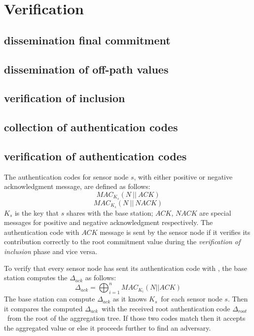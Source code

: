 \chapter{Verification}

\section{dissemination final commitment}
\section{dissemination of off-path values}
\section{verification of inclusion}
\section{collection of authentication codes}
\section{verification of authentication codes}
	The authentication codes for sensor node $s$, with either positive or negative acknowledgment message, are defined as follows:
	\begin{equation}
		MAC_{K_{s}}(N\ ||\ \textit{ACK})
	\end{equation}
	\begin{equation}
		MAC_{K_{s}}(N\ ||\ \textit{NACK})
	\end{equation}
	$K_{s}$ is the key that $s$ shares with the base station;
	$\textit{ACK}$, $\textit{NACK}$ are special messages for positive and negative acknowledgment respectively.
	The authentication code with $\textit{ACK}$ message is sent by the sensor node if it verifies its contribution correctly to the root commitment value during the 
	\textit{verification of inclusion} phase and vice versa.
	
	To verify that every sensor node has sent its authentication code with \ack, the base station computes the $\Delta_{ack}$ as follows:
	\begin{equation}
		\displaystyle{\Delta_{ack} = \bigoplus_{i = 1}^n MAC_{K_{i}}(N || ACK) }
	\end{equation}
	The base station can compute $\Delta_{ack}$ as it knows $K_{s}$\ for each sensor node $s$.
	Then it compares the computed $\Delta_{ack}$\ with the received root authentication code $\Delta_{root}$\ from the root of the aggregation tree. 
	If those two codes match then it accepts the aggregated value or else it proceeds further to find an adversary. 

